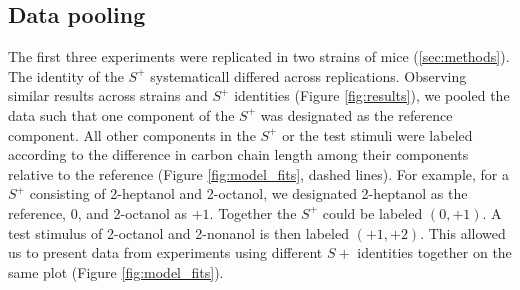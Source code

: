 \subsection*{Data pooling}
\label{results_pooling}
The first three experiments were replicated in two strains of mice (\ref{sec:methods}). 
The identity of the $S^+$ systematicall differed across replications.  
Observing similar results across strains and $S^+$ identities (Figure \ref{fig:results}), we pooled the data such that one component of the $S^+$ was designated as the reference component.  
All other components in the $S^+$ or the test stimuli were labeled according to the difference in carbon chain length among their components relative to the reference (Figure \ref{fig:model_fits}, dashed lines).  
For example, for a $S^+$ consisting of 2-heptanol and 2-octanol, we designated 2-heptanol as the reference, $0$, and 2-octanol as $+1$.  
Together the $S^+$ could be labeled $(0,+1)$.  
A test stimulus of 2-octanol and 2-nonanol is then labeled $(+1,+2)$.  
This allowed us to present data from experiments using different $S+$ identities together on the same plot (Figure \ref{fig:model_fits}).  